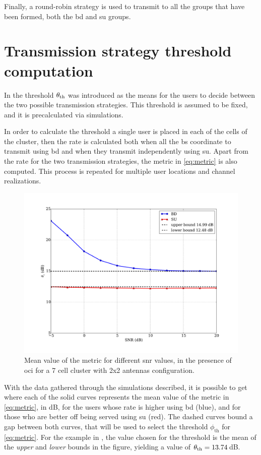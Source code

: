 Finally, a round-robin strategy is used to transmit to all the groups that have
been formed, both the \gls{bd} and \gls{su} groups.

\section{Transmission strategy threshold computation}
\label{ssec:sched_threshold}

In  the threshold $\theta_{\text{th}}$ was introduced as the
means for the users to decide between the two possible transmission strategies.
This threshold is assumed to be fixed, and it is precalculated via simulations.

In order to calculate the threshold a single user is placed in each of the cells
of the cluster, then the rate is calculated both when all the \gls{bs}
coordinate to transmit using \gls{bd} and when they transmit independently using
\gls{su}. Apart from the rate for the two transmission strategies, the metric in
\eqref{eq:metric} is also computed. This process is repeated for multiple user
locations and channel realizations.

\begin{figure}[t]
    \centering
    \includegraphics[width=0.75\columnwidth]{./12.simple_threshold_scheduling/img/mean_metric_02x02}
    \caption{Mean value of the metric for different \gls{snr} values, in the
    presence of \gls{oci} for a 7 cell cluster with 2x2 antennas configuration.}
    \label{fig:threshold_2x2}
\end{figure}

With the data gathered through the simulations described, it is possible to get
 where each of the solid curves represents the mean
value of the metric in \eqref{eq:metric}, in dB, for the users whose rate is
higher using \gls{bd} (blue), and for those who are better off being served
using \gls{su} (red). The dashed curves bound a gap between both curves, that
will be used to select the threshold $\phi_{\text{th}}$ for \eqref{eq:metric}.
For the example in , the value chosen for the threshold
is the mean of the \emph{upper} and \emph{lower} bounds in the figure, yielding
a value of $\theta_{\text{th}} = 13.74$\,dB.

